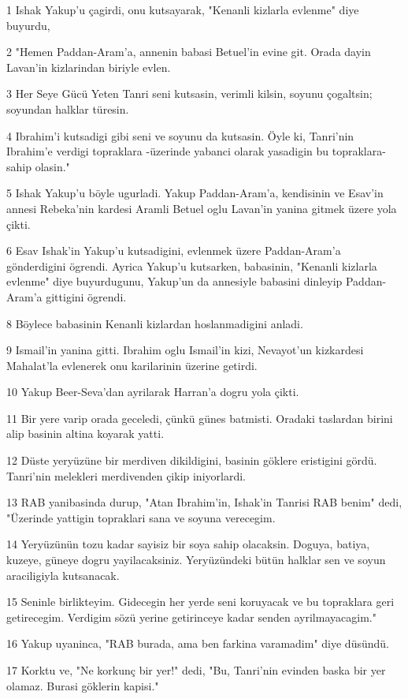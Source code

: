 \par 1 Ishak Yakup'u çagirdi, onu kutsayarak, "Kenanli kizlarla evlenme" diye buyurdu,
\par 2 "Hemen Paddan-Aram'a, annenin babasi Betuel'in evine git. Orada dayin Lavan'in kizlarindan biriyle evlen.
\par 3 Her Seye Gücü Yeten Tanri seni kutsasin, verimli kilsin, soyunu çogaltsin; soyundan halklar türesin.
\par 4 Ibrahim'i kutsadigi gibi seni ve soyunu da kutsasin. Öyle ki, Tanri'nin Ibrahim'e verdigi topraklara -üzerinde yabanci olarak yasadigin bu topraklara- sahip olasin."
\par 5 Ishak Yakup'u böyle ugurladi. Yakup Paddan-Aram'a, kendisinin ve Esav'in annesi Rebeka'nin kardesi Aramli Betuel oglu Lavan'in yanina gitmek üzere yola çikti.
\par 6 Esav Ishak'in Yakup'u kutsadigini, evlenmek üzere Paddan-Aram'a gönderdigini ögrendi. Ayrica Yakup'u kutsarken, babasinin, "Kenanli kizlarla evlenme" diye buyurdugunu, Yakup'un da annesiyle babasini dinleyip Paddan-Aram'a gittigini ögrendi.
\par 8 Böylece babasinin Kenanli kizlardan hoslanmadigini anladi.
\par 9 Ismail'in yanina gitti. Ibrahim oglu Ismail'in kizi, Nevayot'un kizkardesi Mahalat'la evlenerek onu karilarinin üzerine getirdi.
\par 10 Yakup Beer-Seva'dan ayrilarak Harran'a dogru yola çikti.
\par 11 Bir yere varip orada geceledi, çünkü günes batmisti. Oradaki taslardan birini alip basinin altina koyarak yatti.
\par 12 Düste yeryüzüne bir merdiven dikildigini, basinin göklere eristigini gördü. Tanri'nin melekleri merdivenden çikip iniyorlardi.
\par 13 RAB yanibasinda durup, "Atan Ibrahim'in, Ishak'in Tanrisi RAB benim" dedi, "Üzerinde yattigin topraklari sana ve soyuna verecegim.
\par 14 Yeryüzünün tozu kadar sayisiz bir soya sahip olacaksin. Doguya, batiya, kuzeye, güneye dogru yayilacaksiniz. Yeryüzündeki bütün halklar sen ve soyun araciligiyla kutsanacak.
\par 15 Seninle birlikteyim. Gidecegin her yerde seni koruyacak ve bu topraklara geri getirecegim. Verdigim sözü yerine getirinceye kadar senden ayrilmayacagim."
\par 16 Yakup uyaninca, "RAB burada, ama ben farkina varamadim" diye düsündü.
\par 17 Korktu ve, "Ne korkunç bir yer!" dedi, "Bu, Tanri'nin evinden baska bir yer olamaz. Burasi göklerin kapisi."
